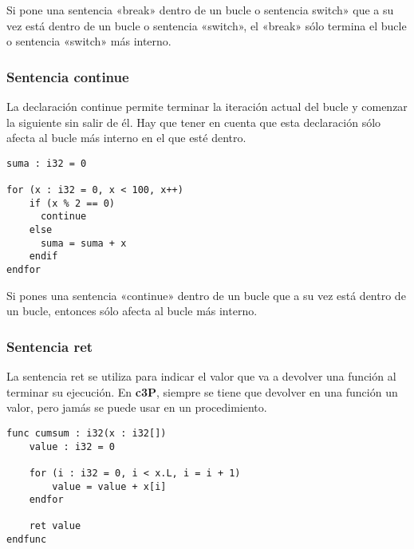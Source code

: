 Si pone una sentencia «break» dentro de un bucle o sentencia switch» que a su vez está dentro de un bucle o sentencia «switch»,
el «break» sólo termina el bucle o sentencia «switch» más interno.

\subsubsection{Sentencia continue}

La declaración continue permite terminar la iteración actual del bucle y
comenzar la siguiente sin salir de él. Hay que tener en cuenta que esta
declaración sólo afecta al bucle más interno en el que esté dentro.

\begin{verbatim}
suma : i32 = 0

for (x : i32 = 0, x < 100, x++)
    if (x % 2 == 0)
      continue
    else
      suma = suma + x
    endif
endfor
\end{verbatim}

Si pones una sentencia «continue» dentro de un bucle que a su vez está dentro de un bucle, entonces sólo afecta al bucle más interno.

\subsubsection{Sentencia ret}

La sentencia ret se utiliza para indicar el valor que va a devolver una función al
terminar su ejecución. En \textbf{c3P}, siempre se tiene que devolver en una
función un valor, pero jamás se puede usar en un procedimiento.

\begin{verbatim}
func cumsum : i32(x : i32[])
    value : i32 = 0

    for (i : i32 = 0, i < x.L, i = i + 1)
        value = value + x[i]
    endfor

    ret value
endfunc
\end{verbatim}

